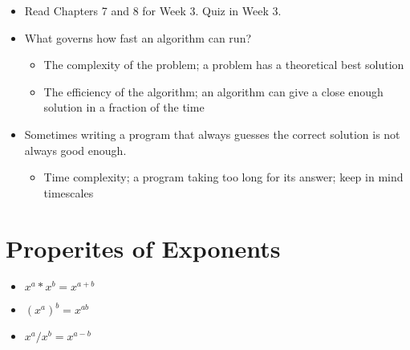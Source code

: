 \documentclass[12pt]{article}
\begin{document}
\begin{itemize}

    \item Read Chapters 7 and 8 for Week 3. Quiz in Week 3.

    \item What governs how fast an algorithm can run?
    \begin{itemize}
        \item The complexity of the problem; a problem has a theoretical best solution
        \item The efficiency of the algorithm; an algorithm can give a close enough solution in a fraction of the time
    \end{itemize}

    \item Sometimes writing a program that always guesses the correct solution is not always good enough.
    \begin{itemize}
        \item Time complexity; a program taking too long for its answer; keep in mind timescales
    \end{itemize}

\end{itemize}

\section*{Properites of Exponents}

\begin{itemize}

    \item $x^a * x^b = x^{a+b}$
    \item $(x^a)^b = x^{ab}$
    \item $x^a / x^b = x^{a-b}$

\end{itemize}
\end{document}
